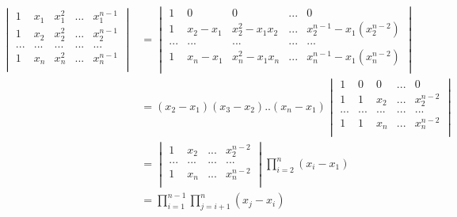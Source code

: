 
\begin{thm}

\end{thm}

\begin{align*}
    \begin{vmatrix}
       1 & x_1 & x_1^2 & ... & x_1^{n-1} \\
       1 & x_2 & x_2^2 & ... & x_2^{n-1} \\
       ... & ... & ... & ... & ...\\
       1 & x_n & x_n^2 & ... & x_n^{n-1} \\
    \end{vmatrix} &= 
    \begin{vmatrix}
       1 & 0 & 0 & ... & 0 \\
       1 & x_2-x_1 & x_2^2-x_1x_2 & ... & x_2^{n-1}-x_1(x_2^{n-2}) \\
       ... & ... & ... & ... & ...\\
       1 & x_n-x_1 & x_n^2-x_1x_n & ... & x_n^{n-1}-x_1(x_n^{n-2}) \\
    \end{vmatrix}  \\
    &= (x_2-x_1)(x_3-x_2)..(x_n-x_1) 
    \begin{vmatrix}
       1 & 0 & 0 & ... & 0 \\
       1 & 1 & x_2 & ... & x_2^{n-2} \\
       ... & ... & ... & ... & ...\\
       1 & 1 & x_n & ... & x_n^{n-2} \\
    \end{vmatrix}  \\
    &= \begin{vmatrix}
         1 & x_2 & ... & x_2^{n-2} \\
         ... & ... & ... & ...\\
         1 & x_n & ... & x_n^{n-2} \\
    \end{vmatrix}\prod_{i=2}^{n}(x_i-x_1) \\
    &= \prod_{i=1}^{n-1}\prod_{j=i+1}^{n}(x_j-x_i)
\end{align*}


